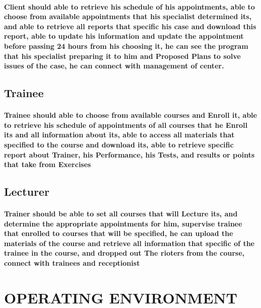 \documentclass[../Psychological_system_web_application.tex]{subfiles}
\begin{document}
			\paragraph{Client should able to retrieve his schedule of his appointments, able to choose from available appointments that his specialist determined its, and able to retrieve all reports that specific his case and download this report, able to update his information and update the appointment before passing 24 hours from his choosing it, he can see the program that his specialist preparing it to him and Proposed Plans to solve issues of the case, he can connect with management of center.}
			
			\subsection{Trainee}
			\paragraph{Trainee should able to choose from available courses and Enroll it, able to retrieve his schedule of appointments of all courses that he Enroll its and all information about its, able to access all materials that specified to the course and download its, able to retrieve specific report about Trainer, his Performance, his Tests, and results or points that take from Exercises}
			
			\subsection{Lecturer}
			\paragraph{Trainer should be able to set all courses that will Lecture its, and determine the appropriate appointments for him, supervise trainee that enrolled to courses that will be specified, he can upload the materials of the course and retrieve all information that specific of the trainee in the course, and dropped out The rioters from the course, connect with trainees and receptionist}
		
		\section{OPERATING ENVIRONMENT}
\end{document}
